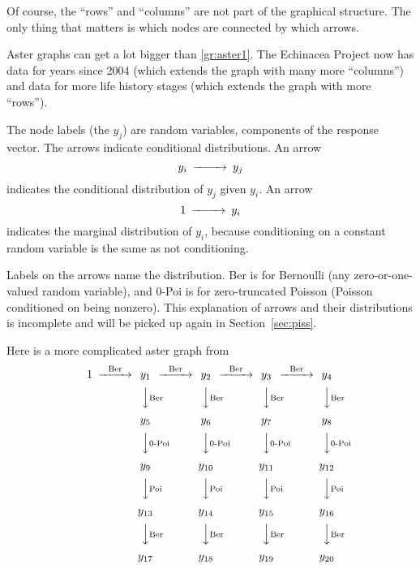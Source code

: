 Of course,
the ``rows'' and ``columns'' are not part of the graphical structure.
The only thing that matters is which nodes are connected by which arrows.

Aster graphs can get a lot bigger than \eqref{gr:aster1}.
The Echinacea Project now has data for years since 2004 (which extends
the graph with many more ``columns'') and data for more life history
stages (which extends the graph with more ``rows'').

The node labels (the $y_j$) are random variables, components of the response
vector.  The arrows indicate conditional distributions.
An arrow
\begin{equation} \label{gr:one-arrow-conditional}
\begin{CD}
   y_i @>>> y_j
\end{CD}
\end{equation}
indicates the conditional distribution of $y_j$ given $y_i$.
An arrow
\begin{equation} \label{gr:one-arrow-marginal}
\begin{CD}
   1 @>>> y_i
\end{CD}
\end{equation}
indicates the marginal distribution of $y_i$,
because conditioning on a constant random variable is the same as not
conditioning.

Labels on the arrows name the distribution.
Ber is for Bernoulli (any zero-or-one-valued random variable), and
0-Poi is for zero-truncated Poisson (Poisson conditioned on being nonzero).
This explanation of arrows and their distributions is incomplete and will
be picked up again in Section~\ref{sec:piss}.

Here is a more complicated aster graph from \citet{aster3}
\begin{equation} \label{gr:aster3}
\begin{CD}
   1
   @>\text{Ber}>>
   y_1
   @>\text{Ber}>>
   y_2
   @>\text{Ber}>>
   y_3
   @>\text{Ber}>>
   y_4
   \\
   @.
   @VV\text{Ber}V
   @VV\text{Ber}V
   @VV\text{Ber}V
   @VV\text{Ber}V
   \\
   \hphantom{1}
   @.
   y_5
   @.
   y_6
   @.
   y_7
   @.
   y_8
   \\
   @.
   @VV\text{0-Poi}V
   @VV\text{0-Poi}V
   @VV\text{0-Poi}V
   @VV\text{0-Poi}V
   \\
   \hphantom{1}
   @.
   y_9
   @.
   y_{10}
   @.
   y_{11}
   @.
   y_{12}
   \\
   @.
   @VV\text{Poi}V
   @VV\text{Poi}V
   @VV\text{Poi}V
   @VV\text{Poi}V
   \\
   \hphantom{1}
   @.
   y_{13}
   @.
   y_{14}
   @.
   y_{15}
   @.
   y_{16}
   \\
   @.
   @VV\text{Ber}V
   @VV\text{Ber}V
   @VV\text{Ber}V
   @VV\text{Ber}V
   \\
   \hphantom{1}
   @.
   y_{17}
   @.
   y_{18}
   @.
   y_{19}
   @.
   y_{20}
\end{CD}
\end{equation}


